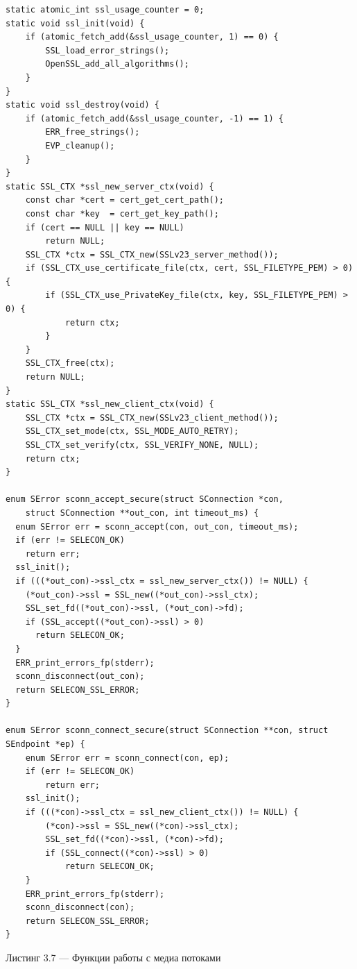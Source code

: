 {\fontsize{11pt}{9pt}\selectfont
\begin{verbatim}
static atomic_int ssl_usage_counter = 0;
static void ssl_init(void) {
	if (atomic_fetch_add(&ssl_usage_counter, 1) == 0) {
		SSL_load_error_strings();
		OpenSSL_add_all_algorithms();
	}
}
static void ssl_destroy(void) {
	if (atomic_fetch_add(&ssl_usage_counter, -1) == 1) {
		ERR_free_strings();
		EVP_cleanup();
	}
}
static SSL_CTX *ssl_new_server_ctx(void) {
	const char *cert = cert_get_cert_path();
	const char *key  = cert_get_key_path();
	if (cert == NULL || key == NULL)
		return NULL;
	SSL_CTX *ctx = SSL_CTX_new(SSLv23_server_method());
	if (SSL_CTX_use_certificate_file(ctx, cert, SSL_FILETYPE_PEM) > 0) {
		if (SSL_CTX_use_PrivateKey_file(ctx, key, SSL_FILETYPE_PEM) > 0) {
			return ctx;
		}
	}
	SSL_CTX_free(ctx);
	return NULL;
}
static SSL_CTX *ssl_new_client_ctx(void) {
	SSL_CTX *ctx = SSL_CTX_new(SSLv23_client_method());
	SSL_CTX_set_mode(ctx, SSL_MODE_AUTO_RETRY);
	SSL_CTX_set_verify(ctx, SSL_VERIFY_NONE, NULL);
	return ctx;
}

enum SError sconn_accept_secure(struct SConnection *con,
    struct SConnection **out_con, int timeout_ms) {
  enum SError err = sconn_accept(con, out_con, timeout_ms);
  if (err != SELECON_OK)
    return err;
  ssl_init();
  if (((*out_con)->ssl_ctx = ssl_new_server_ctx()) != NULL) {
    (*out_con)->ssl = SSL_new((*out_con)->ssl_ctx);
    SSL_set_fd((*out_con)->ssl, (*out_con)->fd);
    if (SSL_accept((*out_con)->ssl) > 0)
      return SELECON_OK;
  }
  ERR_print_errors_fp(stderr);
  sconn_disconnect(out_con);
  return SELECON_SSL_ERROR;
}

enum SError sconn_connect_secure(struct SConnection **con, struct SEndpoint *ep) {
	enum SError err = sconn_connect(con, ep);
	if (err != SELECON_OK)
		return err;
	ssl_init();
	if (((*con)->ssl_ctx = ssl_new_client_ctx()) != NULL) {
		(*con)->ssl = SSL_new((*con)->ssl_ctx);
		SSL_set_fd((*con)->ssl, (*con)->fd);
		if (SSL_connect((*con)->ssl) > 0)
			return SELECON_OK;
	}
	ERR_print_errors_fp(stderr);
	sconn_disconnect(con);
	return SELECON_SSL_ERROR;
}
\end{verbatim}}

Листинг 3.7 --- Функции работы с медиа потоками

